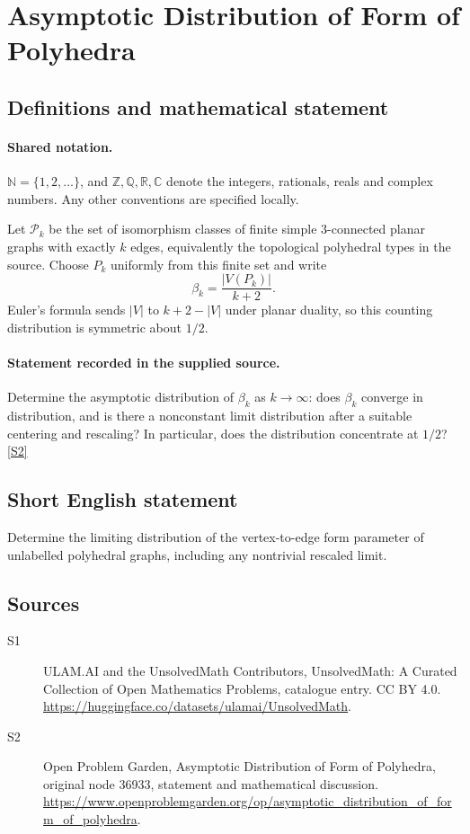 \documentclass[11pt]{article}
\newcommand{\sref}[2]{\hyperlink{source:#1:#2}{[S#2]}}
\begin{document}
\section{Asymptotic Distribution of Form of Polyhedra}\label{statement}

\subsection{Definitions and mathematical statement}

\paragraph{Shared notation.}$\mathbb N=\{1,2,\ldots\}$, and $\mathbb Z,\mathbb Q,\mathbb R,\mathbb C$ denote the integers, rationals, reals and complex numbers. Any other conventions are specified locally.


Let $\mathcal P_k$ be the set of isomorphism classes of finite simple $3$-connected planar graphs with exactly $k$ edges, equivalently the topological polyhedral types in the source. Choose $P_k$ uniformly from this finite set and write \[\beta_k=\frac{|V(P_k)|}{k+2}.\] Euler's formula sends $|V|$ to $k+2-|V|$ under planar duality, so this counting distribution is symmetric about $1/2$.
\paragraph{Statement recorded in the supplied source.}
Determine the asymptotic distribution of $\beta_k$ as $k\to\infty$: does $\beta_k$ converge in distribution, and is there a nonconstant limit distribution after a suitable centering and rescaling? In particular, does the distribution concentrate at $1/2$? \sref{statement}{2}
\subsection{Short English statement}
Determine the limiting distribution of the vertex-to-edge form parameter of unlabelled polyhedral graphs, including any nontrivial rescaled limit.
\subsection{Sources}
\begin{description}
\item[\hypertarget{source:statement:1}{S1}] ULAM.AI and the UnsolvedMath Contributors, UnsolvedMath: A Curated Collection of Open Mathematics Problems, catalogue entry. CC BY 4.0. \url{https://huggingface.co/datasets/ulamai/UnsolvedMath}.
\item[\hypertarget{source:statement:2}{S2}] Open Problem Garden, Asymptotic Distribution of Form of Polyhedra, original node 36933, statement and mathematical discussion. \url{https://www.openproblemgarden.org/op/asymptotic_distribution_of_form_of_polyhedra}.
\end{description}
\label{end:statement}
\end{document}
